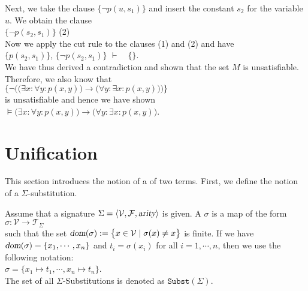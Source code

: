Next, we take the clause $\big\{\neg p(u,s_1)\big\}$ and
insert the constant $s_2$ for the variable $u$.  We obtain the 
clause \\[0.2cm]
\hspace*{1.3cm} $\big\{\neg p(s_2,s_1)\big\}$ \hspace*{\fill} (2) \\[0.2cm]
Now we apply the cut rule to the clauses (1) and (2) and have \\[0.2cm]
\hspace*{1.3cm} 
$\big\{ p(s_2,s_1) \big\}$, \quad$\big\{\neg p(s_2,s_1)\big\}$ \quad $\vdash \quad \{\}$.
\\[0.2cm]
We have thus derived a contradiction and shown that the set $M$ is unsatisfiable.  Therefore, we also know that
\\[0.2cm]
\hspace*{1.3cm} 
$\Big\{ \neg \Big(\big(\exists x\colon \forall y\colon  p(x,y)\big) \rightarrow  \big(\forall y\colon \exists x\colon p(x,y)\big)\Big)\Big\}$
\\[0.2cm]
is unsatisfiable and hence we have shown \\[0.2cm]
\hspace*{1.3cm} 
$\models \big(\exists x\colon \forall y\colon  p(x,y)\big) \rightarrow  \big(\forall y\colon \exists x\colon p(x,y)\big)$.

\section{Unification}
This section introduces the notion of a  of two terms.
First, we define the notion of a $\Sigma$-substitution.

\begin{Definition}
  Assume that a signature $\Sigma = \langle \mathcal{V}, \mathcal{F}, \textsl{arity} \rangle$ is given.
  A  $\sigma$ is a map of the form
  \\[0.2cm]
  \hspace*{1.3cm}
  $\sigma: \mathcal{V} \rightarrow \mathcal{T}_\Sigma$ 
  \\[0.2cm]
  such that the set $\textsl{dom}(\sigma) := \bigl\{ x \in \mathcal{V} \mid \sigma(x) \not= x \bigr\}$ is finite.
  If we have $\textsl{dom}(\sigma) = \{ x_1, \cdots, x_n \}$ and $t_i = \sigma(x_i)$ for all $i = 1, \cdots, n$,
  then we use the following notation:
  \\[0.2cm]
  \hspace*{1.3cm}
  $\sigma = \{ x_1 \mapsto t_1, \cdots, x_n \mapsto t_n \}$.
  \\[0.2cm]
  The set of all $\Sigma$-Substitutions is denoted as $\mathtt{Subst}(\Sigma)$.
  \eox
\end{Definition}

